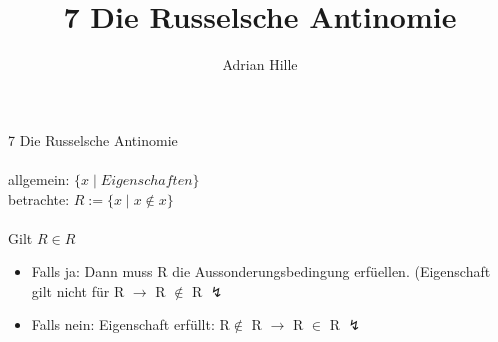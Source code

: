 \documentclass{scrartcl}\usepackage[utf8]{inputenc}
\title{7 Die Russelsche Antinomie}
\author{Adrian Hille}
\begin{document}
\Large 7 Die Russelsche Antinomie\\
\\
\normalsize
allgemein: $\{x \mid Eigenschaften \}$\\
betrachte: $R := \{ x \mid x \notin x\}$\\
\\
Gilt $ R \in R$\\
   \begin{itemize}
    	\item Falls ja: Dann muss R die Aussonderungsbedingung erf\"uellen. (Eigenschaft gilt nicht f\"ur R $\to$ R $\notin$ R $\lightning$
	\item Falls nein: Eigenschaft erf\"ullt: R$\notin$ R $\to$ R $\in$ R $\lightning$\\
    \end{itemize}
\end{document}
